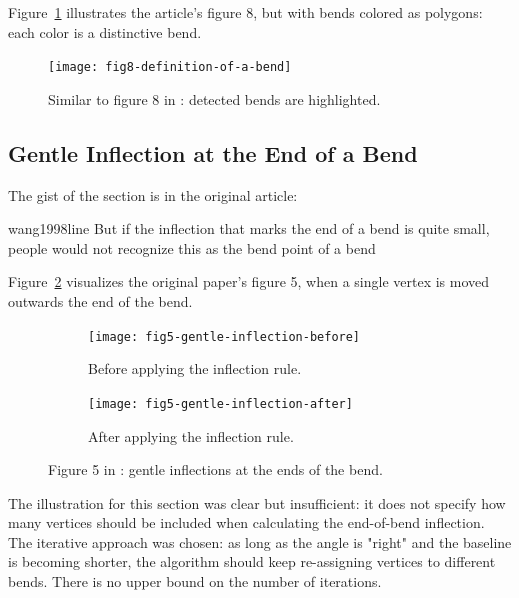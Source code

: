 \documentclass[a4paper]{article}
\begin{document}
Figure~\ref{fig:fig8-definition-of-a-bend} illustrates the article's figure 8,
but with bends colored as polygons: each color is a distinctive bend.

\begin{figure}[ht]
    \centering
    \texttt{[image: fig8-definition-of-a-bend]}

    \caption{Similar to figure 8 in \cite{wang1998line}: detected bends are
    highlighted.}

    \label{fig:fig8-definition-of-a-bend}
\end{figure}

\subsection{Gentle Inflection at the End of a Bend}

The gist of the section is in the original article:

\begin{displaycquote}{wang1998line}
    But if the inflection that marks the end of a bend is quite small, people
    would not recognize this as the bend point of a bend
\end{displaycquote}

Figure~\ref{fig:fig5-gentle-inflection} visualizes the original paper's figure 5,
when a single vertex is moved outwards the end of the bend.

\begin{figure}[ht]
    \centering
    \begin{subfigure}[b]{.49\textwidth}
        \texttt{[image: fig5-gentle-inflection-before]}
        \caption{Before applying the inflection rule.}
    \end{subfigure}
    \hfill
    \begin{subfigure}[b]{.49\textwidth}
        \texttt{[image: fig5-gentle-inflection-after]}
        \caption{After applying the inflection rule.}
    \end{subfigure}
    \caption{Figure 5 in \cite{wang1998line}: gentle inflections at the ends of
    the bend.}
    \label{fig:fig5-gentle-inflection}
\end{figure}


The illustration for this section was clear but insufficient: it does not
specify how many vertices should be included when calculating the end-of-bend
inflection. The iterative approach was chosen: as long as the angle is
"right" and the baseline is becoming shorter, the algorithm should keep
re-assigning vertices to different bends. There is no upper bound
on the number of iterations.
\end{document}
